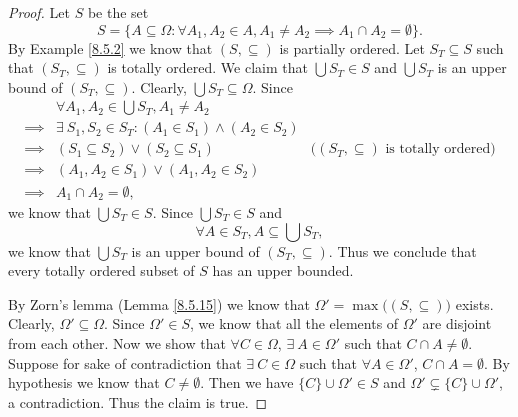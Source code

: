 \begin{proof}
    Let \(S\) be the set
    \[
        S = \{A \subseteq \Omega : \forall A_1, A_2 \in A, A_1 \neq A_2 \implies A_1 \cap A_2 = \emptyset\}.
    \]
    By Example \ref{8.5.2} we know that \((S, \subseteq)\) is partially ordered.
    Let \(S_T \subseteq S\) such that \((S_T, \subseteq)\) is totally ordered.
    We claim that \(\bigcup S_T \in S\) and \(\bigcup S_T\) is an upper bound of \((S_T, \subseteq)\).
    Clearly, \(\bigcup S_T \subseteq \Omega\).
    Since
    \begin{align*}
                 & \forall A_1, A_2 \in \bigcup S_T, A_1 \neq A_2                                                                   \\
        \implies & \exists\ S_1, S_2 \in S_T : (A_1 \in S_1) \land (A_2 \in S_2)                                                    \\
        \implies & (S_1 \subseteq S_2) \lor (S_2 \subseteq S_1)                  & \text{(\((S_T, \subseteq)\) is totally ordered)} \\
        \implies & (A_1, A_2 \in S_1) \lor (A_1, A_2 \in S_2)                                                                       \\
        \implies & A_1 \cap A_2 = \emptyset,
    \end{align*}
    we know that \(\bigcup S_T \in S\).
    Since \(\bigcup S_T \in S\) and
    \[
        \forall A \in S_T, A \subseteq \bigcup S_T,
    \]
    we know that \(\bigcup S_T\) is an upper bound of \((S_T, \subseteq)\).
    Thus we conclude that every totally ordered subset of \(S\) has an upper bounded.

    By Zorn's lemma (Lemma \ref{8.5.15}) we know that \(\Omega' = \max\big((S, \subseteq)\big)\) exists.
    Clearly, \(\Omega' \subseteq \Omega\).
    Since \(\Omega' \in S\), we know that all the elements of \(\Omega'\) are disjoint from each other.
    Now we show that \(\forall C \in \Omega\), \(\exists\ A \in \Omega'\) such that \(C \cap A \neq \emptyset\).
    Suppose for sake of contradiction that \(\exists\ C \in \Omega\) such that \(\forall A \in \Omega'\), \(C \cap A = \emptyset\).
    By hypothesis we know that \(C \neq \emptyset\).
    Then we have \(\{C\} \cup \Omega' \in S\) and \(\Omega' \subsetneq \{C\} \cup \Omega'\), a contradiction.
    Thus the claim is true.


\end{proof}
